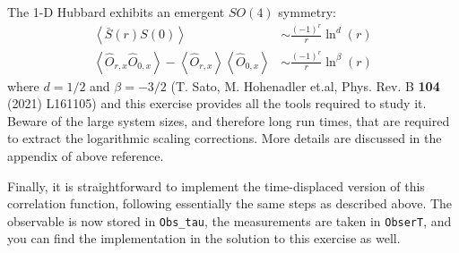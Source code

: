 \documentclass[10pt,modern]{scrartcl}
\numberwithin{exerciseitem}{exercise} %
\begin{document}
The 1-D Hubbard exhibits an emergent $SO(4)$ symmetry:
\begin{align}
\left\langle \bar{S}(r)S(0) \right\rangle  &\sim  \frac{(-1)^r}{r}\ln^d(r)\\
\left\langle \hat{O}_{r,x} \hat{O}_{0,x} \right\rangle  -  \left\langle \hat{O}_{r,x} \right\rangle \left\langle \hat{O}_{0,x} \right\rangle  &\sim   \frac{(-1)^r}{r}\ln^\beta(r)
\end{align}
where $d=1/2$ and $\beta=-3/2$ (T. Sato, M. Hohenadler et.al, Phys. Rev. B \textbf{104} (2021) L161105) and this exercise provides all the tools required to study it. Beware of the large system sizes, and therefore long run times, that are required to extract the logarithmic scaling corrections. More details are discussed in the appendix of above reference.

Finally, it is straightforward to implement the time-displaced version of this correlation function, following essentially the same steps as described above. The observable is now stored in \texttt{Obs\_tau}, the measurements are taken in \texttt{ObserT}, and you can find the implementation in the solution to this exercise as well.
\end{document}
